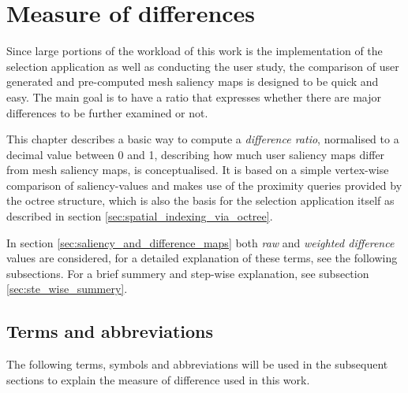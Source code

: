 	\section {Measure of differences}
	\label{sec:measure_of_difference}
Since large portions of the workload of this work is the implementation of the selection application as well as conducting the user study, the comparison of user generated and pre-computed mesh saliency maps is designed to be quick and easy. The main goal is to have a ratio that expresses whether there are major differences to be further examined or not.

This chapter describes a basic way to compute a \textit{difference ratio}, normalised to a decimal value between 0 and 1, describing how much user saliency maps differ from mesh saliency maps, is conceptualised. It is based on a simple vertex-wise comparison of saliency-values and makes use of the proximity queries provided by the octree structure, which is also the basis for the selection application itself as described in section \ref{sec:spatial_indexing_via_octree}.

In section \ref{sec:saliency_and_difference_maps} both \textit{raw} and \textit{weighted difference} values are considered, for a detailed explanation of these terms, see the following subsections. For a brief summery and step-wise explanation, see subsection \ref{sec:ste_wise_summery}.

		\subsection{Terms and abbreviations}
		\label{sec:concept_terms_and_abbreviations}
The following terms, symbols and abbreviations will be used in the subsequent sections to explain the measure of difference used in this work.

